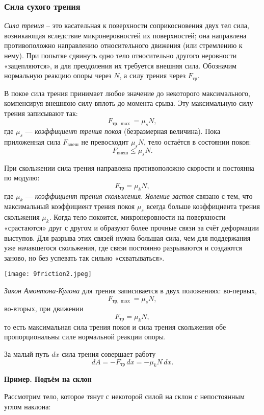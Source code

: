 \documentclass[12pt, a4paper]{article}%
\begin{document}
\subsubsection*{Сила сухого трения}
\textit{Сила трения} – это касательная к поверхности соприкосновения двух тел сила, возникающая вследствие микронеровностей их поверхностей; она направлена противоположно направлению относительного движения (или стремлению к нему).
При попытке сдвинуть одно тело относительно другого неровности «зацепляются», и для преодоления их требуется внешняя сила. Обозначим нормальную реакцию опоры через $N$, а силу трения через $F_{\mathrm{тр}}$.

В покое сила трения принимает любое значение до некоторого максимального, компенсируя внешнюю силу вплоть до момента срыва. Эту максимальную силу трения записывают так:
\[
F_{\mathrm{тр},\max} = \mu_sN,
\]
где $\mu_s$ — \textit{коэффициент трения покоя} (безразмерная величина). Пока приложенная сила $F_{\mathrm{внеш}}$ не превосходит $\mu_s N$, тело остаётся в состоянии покоя:
\[
F_{\mathrm{внеш}}\le \mu_s N.
\]

При скольжении сила трения направлена противоположно скорости и постоянна по модулю:
\[
F_{\mathrm{тр}} = \mu_kN,
\]
где $\mu_k$ — \textit{коэффициент трения скольжения}. \textit{Явление застоя} связано с тем, что максимальный коэффициент трения покоя $\mu_s$ всегда больше коэффициента трения скольжения $\mu_k$. Когда тело покоится, микронеровности на поверхности «срастаются» друг с другом и образуют более прочные связи за счёт деформации выступов. Для разрыва этих связей нужна большая сила, чем для поддержания уже начавшегося скольжения, где связи постоянно разрываются и создаются заново, но без успевать так сильно «схватываться».

\begin{center}
\texttt{[image: 9friction2.jpeg]}
\label{fig:mpr}
\end{center}

\textit{Закон Амонтона-Кулона} для трения записивается в двух положениях: во-первых,
\[
F_{\mathrm{тр},\max}=\mu_s N,
\]
во-вторых, при движении
\[
F_{\mathrm{тр}}=\mu_k N,
\]
то есть максимальная сила трения покоя и сила трения скольжения обе пропорциональны силе нормальной реакции опоры.


За малый путь \(dx\) сила трения совершает работу
\[
dA = -F_{\mathrm{тр}}\,dx = -\mu_kN\,dx.
\]


\textbf{Пример. Подъём на склон}

Рассмотрим тело, которое тянут с некоторой силой на склон с непостоянным углом наклона:
\end{document}
